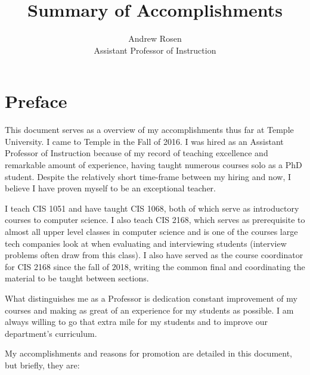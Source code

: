 \documentclass[]{article}
\title{Summary of Accomplishments}
\author{Andrew Rosen\\Assistant Professor of Instruction}
\begin{document}
\maketitle


\section{Preface}
This document serves as a overview of my accomplishments thus far at Temple University.  
I came to Temple in the Fall of 2016.
I was hired as an Assistant Professor of Instruction because of my record of teaching excellence and remarkable amount of experience, having taught numerous courses solo as a PhD student.
Despite the relatively short time-frame between my hiring and now, I believe I have proven myself to be an exceptional teacher.

I teach CIS 1051 and  have taught CIS 1068, both of which serve as introductory courses to computer science.
I also teach CIS 2168,  which serves as prerequisite to almost all upper level classes in computer science and is one of the courses large tech companies look at when evaluating and interviewing students (interview problems often draw from this class).  
I also have served as the course coordinator for CIS 2168 since the fall of 2018, writing the common final and coordinating the material to be taught between sections.

What distinguishes me as a Professor is dedication constant improvement of my courses and making as great of an experience for my students as possible.
I am always willing to go that extra mile for my students and to improve our department's curriculum.



My accomplishments and reasons for promotion are detailed  in this document, but briefly, they are:
\end{document}

